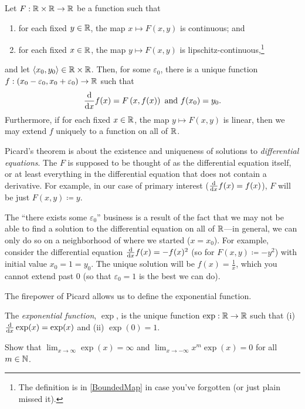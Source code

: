 \begin{thm}\label{PicardsExistenceTheorem}
Let $F:\mathbb{R} \times \mathbb{R} \rightarrow \mathbb{R}$ be a function such that
\begin{enumerate}
\item for each fixed $y\in \mathbb{R}$, the map $x\mapsto F(x,y)$ is continuous; and
\item for each fixed $x\in \mathbb{R}$, the map $y\mapsto F(x,y)$ is lipschitz-continuous,\footnote{The definition is in \cref{BoundedMap} in case you've forgotten (or just plain missed it).}
\end{enumerate}
and let $\langle x_0,y_0\rangle\in \mathbb{R} \times \mathbb{R}$.  Then, for some $\varepsilon _0$, there is a unique function $f:(x_0-\varepsilon _0,x_0+\varepsilon _0)\rightarrow \mathbb{R}$ such that
\begin{equation}
\frac{\mathop{}\!\mathrm{d}}{\mathop{}\!\mathrm{d} x}f(x)=F\left( x,f(x)\right) \text{ and }f(x_0)=y_0.
\end{equation}
Furthermore, if for each fixed $x\in \mathbb{R}$, the map $y\mapsto F(x,y)$ is linear, then we may extend $f$ uniquely to a function on all of $\mathbb{R}$.
\begin{rmk}
Picard's theorem is about the existence and uniqueness of solutions to \emph{differential equations}.  The $F$ is supposed to be thought of as the differential equation itself, or at least everything in the differential equation that does not contain a derivative.  For example, in our case of primary interest ($\frac{\mathop{}\!\mathrm{d}}{\mathop{}\!\mathrm{d} x}f(x)=f(x)$), $F$ will be just $F(x,y)\coloneqq y$.
\end{rmk}
\begin{rmk}
The ``there exists some $\varepsilon _0$'' business is a result of the fact that we may not be able to find a solution to the differential equation on all of $\mathbb{R}$---in general, we can only do so on a neighborhood of where we started ($x=x_0$).  For example, consider the differential equation $\frac{\mathop{}\!\mathrm{d}}{\mathop{}\!\mathrm{d} x}f(x)=-f(x)^2$ (so for $F(x,y)\coloneqq -y^2$) with initial value $x_0=1=y_0$.  The unique solution will be $f(x)=\frac{1}{x}$, which you cannot extend past $0$ (so that $\varepsilon _0=1$ is the best we can do).
\end{rmk}
\end{thm}
The firepower of Picard allows us to define the exponential function.
\begin{dfn}\label{ExponentialFunction}
The \emph{exponential function}, $\exp$\index[notation]{$\exp$}, is the unique function $\exp :\mathbb{R} \rightarrow \mathbb{R}$ such that (i) $\frac{\mathop{}\!\mathrm{d}}{\mathop{}\!\mathrm{d} x}\exp (x)=\exp (x)$ and (ii) $\exp (0)=1$.
\end{dfn}
\begin{exr}
Show that $\lim _{x\to \infty}\exp (x)=\infty$ and $\lim _{x\to -\infty}x^m\exp (x)=0$ for all $m\in \mathbb{N}$.
\end{exr}

